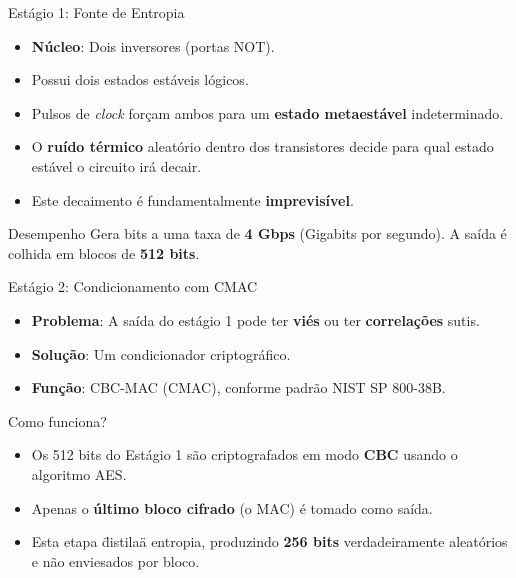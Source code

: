 \begin{frame}{Estágio 1: Fonte de Entropia}

    \begin{itemize}
        \item \textbf{Núcleo}: Dois inversores (portas NOT).
        \item Possui dois estados estáveis lógicos.
        \item Pulsos de \textit{clock} forçam ambos para um \textbf{estado metaestável} indeterminado.
        \item O \textbf{ruído térmico} aleatório dentro dos transistores decide para qual estado estável o circuito irá decair.
        \item Este decaimento é fundamentalmente \textbf{imprevisível}.
    \end{itemize}
    \vspace{0.5cm}
    \begin{block}{Desempenho}
        Gera bits a uma taxa de \textbf{4 Gbps} (Gigabits por segundo). A saída é colhida em blocos de \textbf{512 bits}.
    \end{block}
\end{frame}

\begin{frame}{Estágio 2: Condicionamento com CMAC}
    \begin{itemize}
        \item \textbf{Problema}: A saída do estágio 1 pode ter \textbf{viés} ou ter \textbf{correlações} sutis.
        \item \textbf{Solução}: Um condicionador criptográfico.
        \item \textbf{Função}: CBC-MAC (CMAC), conforme padrão NIST SP 800-38B.
    \end{itemize}



    \begin{block}{Como funciona?}
        \begin{itemize}
            \item Os 512 bits do Estágio 1 são criptografados em modo \textbf{CBC} usando o algoritmo AES.
            \item Apenas o \textbf{último bloco cifrado} (o MAC) é tomado como saída.
            \item Esta etapa \"distila\" a entropia, produzindo \textbf{256 bits} verdadeiramente aleatórios e não enviesados por bloco.
        \end{itemize}
    \end{block}
\end{frame}

